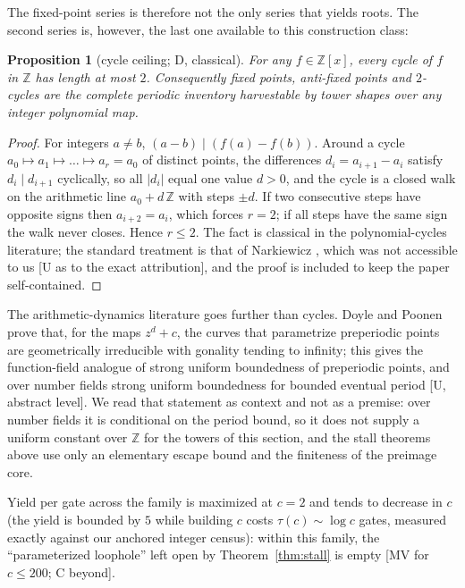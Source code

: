 \documentclass[11pt]{article}
\newtheorem{proposition}[theorem]{Proposition}
\theoremstyle{definition}
\theoremstyle{remark}
\newcommand{\Z}{\mathbb{Z}}
\begin{document}
The fixed-point series is therefore not the only series that yields roots. The second
series is, however, the last one available to this construction class:

\begin{proposition}[cycle ceiling; D, classical]\label{prop:cycles}
For any $f \in \Z[x]$, every cycle of $f$ in $\Z$ has length at most $2$.
Consequently fixed points, anti-fixed points and $2$-cycles are the complete
periodic inventory harvestable by tower shapes over any integer polynomial map.
\end{proposition}
\begin{proof}
For integers $a \ne b$, $(a - b) \mid (f(a) - f(b))$. Around a cycle
$a_0 \mapsto a_1 \mapsto \dots \mapsto a_r = a_0$ of distinct points, the
differences $d_i = a_{i+1} - a_i$ satisfy $d_i \mid d_{i+1}$ cyclically, so all
$|d_i|$ equal one value $d > 0$, and the cycle is a closed walk on the arithmetic
line $a_0 + d\,\Z$ with steps $\pm d$. If two consecutive steps have opposite signs
then $a_{i+2} = a_i$, which forces $r = 2$; if all steps have the same sign the walk
never closes. Hence $r \le 2$. The fact is classical in the polynomial-cycles
literature; the standard treatment is that of Narkiewicz \cite{Narkiewicz1995}, which
was not accessible to us [U as to the exact attribution], and the proof is included to keep
the paper self-contained.
\end{proof}

The arithmetic-dynamics literature goes further than cycles. Doyle and Poonen prove that, for
the maps $z^d + c$, the curves that parametrize preperiodic points are geometrically irreducible
with gonality tending to infinity; this gives the function-field analogue of strong uniform
boundedness of preperiodic points, and over number fields strong uniform boundedness for
bounded eventual period \cite{DoylePoonen2020} [U, abstract level]. We read that statement as
context and not as a premise: over number fields it is conditional on the period bound, so
it does not supply a uniform constant over $\Z$ for the towers of this section, and the stall
theorems above use only an elementary escape bound and the finiteness of the preimage core.

Yield per gate across the family is maximized at $c = 2$ and tends to decrease in $c$ (the
yield is bounded by $5$ while building $c$ costs $\tau(c) \sim \log c$ gates,
measured exactly against our anchored integer census): within this family, the
``parameterized loophole'' left open by Theorem~\ref{thm:stall} is empty [MV for
$c \le 200$; C beyond].
\end{document}
